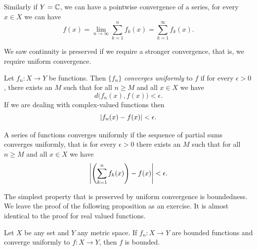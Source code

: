 Similarly if $Y={\mathbb{C}}$, we can have a pointwise convergence of a series,
for every $x \in X$ we can have
\begin{equation*}
f(x) = \lim_{n\to \infty} \sum_{k=1}^n f_k(x) =
\sum_{k=1}^\infty f_k(x) .
\end{equation*}

We saw continuity is preserved if we require a stronger convergence,
that is, we require uniform convergence.

Let $f_n \colon X \to Y$ be functions.  Then
$\{f_n\}$ \emph{converges uniformly} to $f$ if
for every $\epsilon > 0$, there exists an $M$ such that
for all $n \geq M$ and all $x \in X$ we have
\begin{equation*}
d\bigl(f_n(x),f(x)\bigr) < \epsilon .
\end{equation*}
If we are dealing with complex-valued functions then
\begin{equation*}
\lvert {f_n(x)-f(x)} \rvert < \epsilon .
\end{equation*}

A series of functions converges uniformly if the sequence of
partial sums converges uniformly, that is for every $\epsilon > 0$
there exists an $M$ such that
for all $n \geq M$ and all $x \in X$ we have
\begin{equation*}
\left\lvert {\left(\sum_{k=1}^nf_k(x)\right)-f(x)} \right\rvert < \epsilon .
\end{equation*}

%

The simplest property that is preserved by uniform convergence is
boundedness.  We leave the proof of the following proposition as an
exercise.  It is almost identical to the proof for real valued functions.

\begin{prop} \label{prop:uniformconvbounded}
Let $X$ be any set and $Y$ any metric space.
If $f_n \colon X \to Y$ are bounded functions and converge uniformly to $f
\colon X \to Y$, then $f$ is bounded.
\end{prop}

